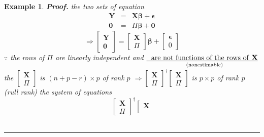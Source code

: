 \documentclass{article}
\newtheorem{example}[theorem]{Example}
\newenvironment{proof}[1][Proof]{\noindent\textbf{#1.} }{\ \rule{0.5em}{0.5em}}
\begin{document}
\begin{example}
\begin{proof}
the two sets of equation%
\begin{eqnarray*}
\mathbf{Y} &=&\mathbf{X\beta +\epsilon } \\
\mathbf{0} &=&\Pi \mathbf{\beta +0}
\end{eqnarray*}%
\begin{equation*}
\Rightarrow \left[ 
\begin{array}{c}
\mathbf{Y} \\ 
\mathbf{0}%
\end{array}%
\right] =\left[ 
\begin{array}{c}
\mathbf{X} \\ 
\Pi 
\end{array}%
\right] \mathbf{\beta +}\left[ 
\begin{array}{c}
\mathbf{\epsilon } \\ 
0%
\end{array}%
\right] 
\end{equation*}%
$\because $ the rows of $\Pi $ are linearly independent and $\underset{\text{%
(nonestimable)}}{\underline{\text{are not functions of the rows of \textbf{X}%
}}}$\newline
\newline
the $\left[ 
\begin{array}{c}
\mathbf{X} \\ 
\Pi 
\end{array}%
\right] $ is $\left( n+p-r\right) \times p$ of rank $p$\newline
\newline
$\Rightarrow \left[ 
\begin{array}{c}
\mathbf{X} \\ 
\Pi 
\end{array}%
\right] ^{\dagger }\left[ 
\begin{array}{c}
\mathbf{X} \\ 
\Pi 
\end{array}%
\right] $ is $p\times p$ of rank $p$ (rull rank)\newline
\newline
the system of equations%
\begin{equation*}
\left[ 
\begin{array}{c}
\mathbf{X} \\ 
\Pi 
\end{array}%
\right] ^{\dagger }\left[ 
\begin{array}{c}
\mathbf{X} \\ 

\end{array}
\end{equation*}
\end{proof}
\end{example}
\end{document}
